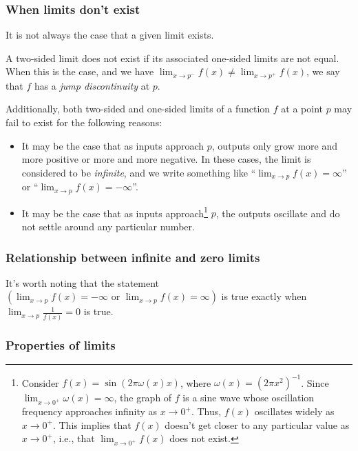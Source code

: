 \documentclass{article}
\begin{document}
\subsubsection*{When limits don't exist}

It is not always the case that a given limit exists. 

A two-sided limit does not exist if its associated one-sided limits are not equal. When this is the case, and we have $\lim_{x \rightarrow p^-} f(x) \neq \lim_{x \rightarrow p^+} f(x)$, we say that $f$ has a \textit{jump discontinuity} at $p$.

Additionally, both two-sided and one-sided limits of a function $f$ at a point $p$ may fail to exist for the following reasons:

\begin{itemize}
    \item It may be the case that as inputs approach $p$, outputs only grow more and more positive or more and more negative. In these cases, the limit is considered to be \textit{infinite}, and we write something like ``$\lim_{x \rightarrow p} f(x) = \infty$'' or ``$\lim_{x \rightarrow p} f(x) = -\infty$''.
    \item It may be the case that as inputs approach\footnote{Consider $f(x) = \sin(2 \pi \omega(x) x)$, where $\omega(x) = (2 \pi x^2)^{-1}$. Since $\lim_{x \rightarrow 0^+} \omega(x) = \infty$, the graph of $f$ is a sine wave whose oscillation frequency approaches infinity as $x \rightarrow 0^+$. Thus, $f(x)$ oscillates widely as $x \rightarrow 0^+$. This implies that $f(x)$ doesn't get closer to any particular value as $x \rightarrow 0^+$, i.e., that $\lim_{x \rightarrow 0^+} f(x)$ does not exist.} $p$, the outputs oscillate and do not settle around any particular number.
\end{itemize}

\subsubsection*{Relationship between infinite and zero limits}

It's worth noting that the statement $(\lim_{x \rightarrow p} f(x) = - \infty \text{ or } \lim_{x \rightarrow p} f(x) = \infty)$ is true exactly when $\lim_{x \rightarrow p} \frac{1}{f(x)} = 0$ is true.

\subsubsection*{Properties of limits}
\end{document}

